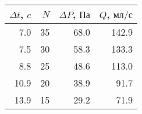 \begin{tabular}{rrrr}
\toprule
$\Delta t$, $c$ & $N$ & $\Delta P$, $Па$ & $Q$, $мл/с$ \\
\midrule
7.0 & 35 & 68.0 & 142.9 \\
7.5 & 30 & 58.3 & 133.3 \\
8.8 & 25 & 48.6 & 113.0 \\
10.9 & 20 & 38.9 & 91.7 \\
13.9 & 15 & 29.2 & 71.9 \\
\bottomrule
\end{tabular}
